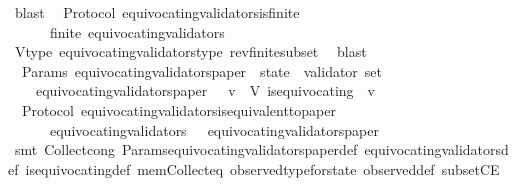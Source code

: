 \begin{isabellebody}
\ blast%
\endisatagproof
{\isafoldproof}%
%
\isadelimproof
\isanewline
%
\endisadelimproof
\isanewline
{}\isamarkupfalse%
\ {\isacharparenleft}\ Protocol{\isacharparenright}\ equivocating{\isacharunderscore}validators{\isacharunderscore}is{\isacharunderscore}finite\ {\isacharcolon}\isanewline
\ \ {\isachardoublequoteopen}{\isasymforall}\ {\isasymsigma}\ {\isasymin}\ {\isasymSigma}{\isachardot}\ finite\ {\isacharparenleft}equivocating{\isacharunderscore}validators\ {\isasymsigma}{\isacharparenright}{\isachardoublequoteclose}\isanewline
%
\isadelimproof
\ \ %
\endisadelimproof
%
\isatagproof
{}\isamarkupfalse%
\ V{\isacharunderscore}type\ equivocating{\isacharunderscore}validators{\isacharunderscore}type\ rev{\isacharunderscore}finite{\isacharunderscore}subset\ \isamarkupfalse%
\ blast%
\endisatagproof
{\isafoldproof}%
%
\isadelimproof
\isanewline
%
\endisadelimproof
\isanewline
{}\isamarkupfalse%
\ {\isacharparenleft}\ Params{\isacharparenright}\ equivocating{\isacharunderscore}validators{\isacharunderscore}paper\ {\isacharcolon}{\isacharcolon}\ {\isachardoublequoteopen}state\ {\isasymRightarrow}\ validator\ set{\isachardoublequoteclose}\isanewline
\ \ \isanewline
\ \ \ \ {\isachardoublequoteopen}equivocating{\isacharunderscore}validators{\isacharunderscore}paper\ {\isasymsigma}\ {\isacharequal}\ {\isacharbraceleft}v\ {\isasymin}\ V{\isachardot}\ is{\isacharunderscore}equivocating\ {\isasymsigma}\ v{\isacharbraceright}{\isachardoublequoteclose}\isanewline
\isanewline
{}\isamarkupfalse%
\ {\isacharparenleft}\ Protocol{\isacharparenright}\ equivocating{\isacharunderscore}validators{\isacharunderscore}is{\isacharunderscore}equivalent{\isacharunderscore}to{\isacharunderscore}paper\ {\isacharcolon}\isanewline
\ \ {\isachardoublequoteopen}{\isasymforall}\ {\isasymsigma}\ {\isasymin}\ {\isasymSigma}{\isachardot}\ equivocating{\isacharunderscore}validators\ {\isasymsigma}\ {\isacharequal}\ equivocating{\isacharunderscore}validators{\isacharunderscore}paper\ {\isasymsigma}{\isachardoublequoteclose}\isanewline
%
\isadelimproof
\ \ %
\endisadelimproof
%
\isatagproof
{}\isamarkupfalse%
\ {\isacharparenleft}smt\ Collect{\isacharunderscore}cong\ Params{\isachardot}equivocating{\isacharunderscore}validators{\isacharunderscore}paper{\isacharunderscore}def\ equivocating{\isacharunderscore}validators{\isacharunderscore}def\ is{\isacharunderscore}equivocating{\isacharunderscore}def\ mem{\isacharunderscore}Collect{\isacharunderscore}eq\ observed{\isacharunderscore}type{\isacharunderscore}for{\isacharunderscore}state\ observed{\isacharunderscore}def\ subsetCE{\isacharparenright}%

\end{isabellebody}
